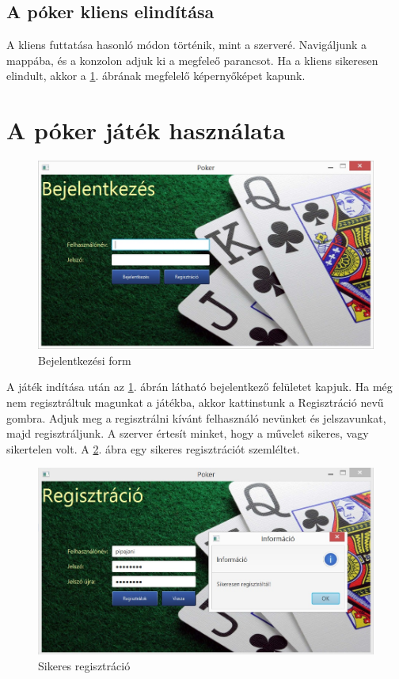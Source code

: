 \subsection{A póker kliens elindítása}
A kliens futtatása hasonló módon történik, mint a szerveré. Navigáljunk a  mappába, és a konzolon adjuk ki a megfeleő parancsot. Ha a kliens sikeresen elindult, akkor a \ref{fig:client_login}. ábrának megfelelő képernyőképet kapunk.

\section{A póker játék használata}
\begin{figure}[h!]
  \caption{Bejelentkezési form}
  \label{fig:client_login}
  \centering
    \includegraphics[width=\textwidth]{user-documentation/images/login.jpg}
\end{figure}
A játék indítása után az \ref{fig:client_login}. ábrán látható bejelentkező felületet kapjuk. Ha még nem regisztráltuk magunkat a játékba, akkor kattinstunk a Regisztráció nevű gombra. Adjuk meg a regisztrálni kívánt felhasználó nevünket és jelszavunkat, majd regisztráljunk. A szerver értesít minket, hogy a művelet sikeres, vagy sikertelen volt. A \ref{fig:reg_succ}. ábra egy sikeres regisztrációt szemléltet.
\begin{figure}[h!]
  \caption{Sikeres regisztráció}
  \label{fig:reg_succ}
  \centering
    \includegraphics[width=\textwidth]{user-documentation/images/succ_reg.jpg}
\end{figure}

